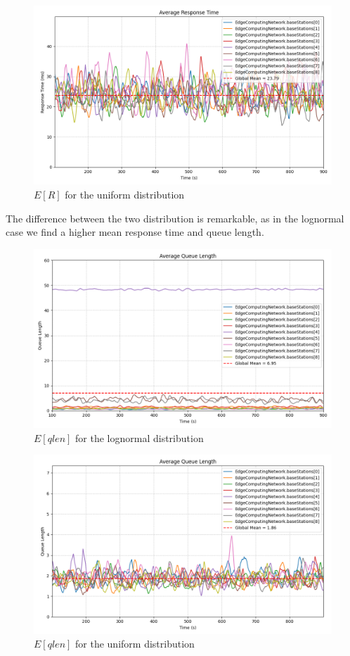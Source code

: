 \documentclass{report}
\begin{document}
\begin{figure}[H]
    \centering
    \includegraphics[width=\textwidth]{img/plots/uni_1e3_A/resptime.png}
    \caption{$E[R]$ for the uniform distribution}
\end{figure}

The difference between the two distribution is remarkable, as in the lognormal case we find a higher mean response time and queue length.

\begin{figure}[H]
    \centering
    \includegraphics[width=\textwidth]{img/plots/log_1e3_A/qlen.png}
    \caption{$E[qlen]$ for the lognormal distribution}
\end{figure}

\begin{figure}[H]
    \centering
    \includegraphics[width=\textwidth]{img/plots/uni_1e3_A/qlen.png}
    \caption{$E[qlen]$ for the uniform distribution}
\end{figure}
\end{document}
